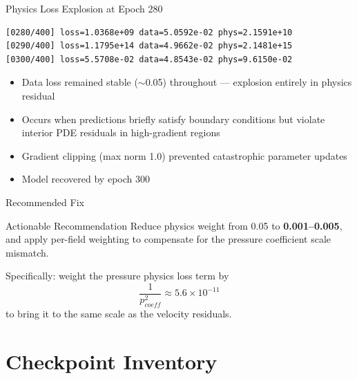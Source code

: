 \documentclass[aspectratio=169]{beamer}
\begin{document}
\begin{frame}{Physics Loss Explosion at Epoch 280}
\begin{verbatim}
[0280/400] loss=1.0368e+09 data=5.0592e-02 phys=2.1591e+10
[0290/400] loss=1.1795e+14 data=4.9662e-02 phys=2.1481e+15
[0300/400] loss=5.5708e-02 data=4.8543e-02 phys=9.6150e-02
\end{verbatim}

\vspace{0.3cm}
\begin{itemize}
  \item Data loss remained stable ($\sim$0.05) throughout --- explosion entirely in physics residual
  \item Occurs when predictions briefly satisfy boundary conditions but violate interior PDE residuals in high-gradient regions
  \item Gradient clipping (max norm 1.0) prevented catastrophic parameter updates
  \item Model recovered by epoch 300
\end{itemize}
\end{frame}

\begin{frame}{Recommended Fix}
\begin{alertblock}{Actionable Recommendation}
Reduce physics weight from 0.05 to \textbf{0.001--0.005}, and apply per-field weighting to compensate for the pressure coefficient scale mismatch.
\end{alertblock}

\vspace{0.3cm}
Specifically: weight the pressure physics loss term by
\[
\frac{1}{p_{coeff}^2} \approx 5.6\times10^{-11}
\]
to bring it to the same scale as the velocity residuals.
\end{frame}

\section{Checkpoint Inventory}
\end{document}
